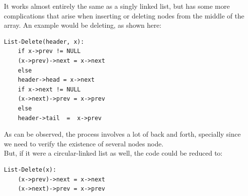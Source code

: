 \documentclass[nobib]{tufte-handout}
\begin{document}
It works almost entirely the same as a singly linked list, but has some more complications that arise when inserting or deleting nodes from the middle of the array. An example would be deleting, as shown here:
\begin{lstlisting}
List-Delete(header, x):
    if x->prev != NULL
    (x->prev)->next = x->next
    else
    header->head = x->next
    if x->next != NULL
    (x->next)->prev = x->prev
    else
    header->tail  =  x->prev
\end{lstlisting}
As can be observed, the process involves a lot of back and forth, specially
since we need to verify the existence of several nodes node.\\ But, if it were
a circular-linked list as well, the code could be reduced to:
\begin{lstlisting}
List-Delete(x):
    (x->prev)->next = x->next
    (x->next)->prev = x->prev
\end{lstlisting}
\end{document}
